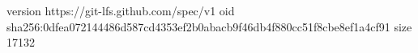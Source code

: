 version https://git-lfs.github.com/spec/v1
oid sha256:0dfea072144486d587cd4353ef2b0abacb9f46db4f880cc51f8cbe8ef1a4cf91
size 17132
